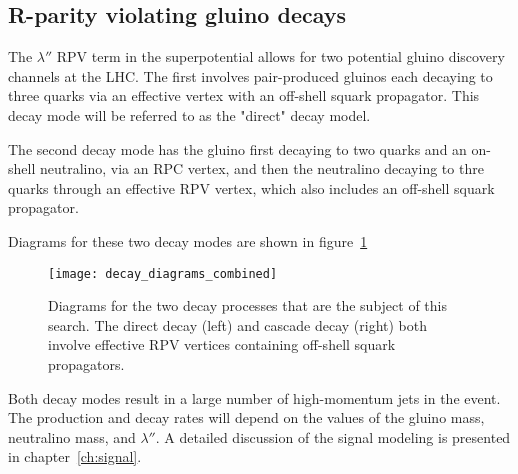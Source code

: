 \subsection{R-parity violating gluino decays}\label{subsec:rpv_gluino}

The $\lambda''$ RPV term in the superpotential allows for two potential gluino discovery channels at the LHC.
The first involves pair-produced gluinos each decaying to three quarks via an effective vertex with an off-shell squark propagator.
This decay mode will be referred to as the "direct" decay model.

The second decay mode has the gluino first decaying to two quarks and an on-shell neutralino, via an RPC vertex,
and then the neutralino decaying to thre quarks through an effective RPV vertex,
which also includes an off-shell squark propagator.

Diagrams for these two decay modes are shown in figure~\ref{fig:susy_rpv_decays}

\begin{figure}[h!]
    \centering
\texttt{[image: decay\_diagrams\_combined]}
\caption{Diagrams for the two decay processes that are the subject of this search. The direct decay (left) and cascade decay (right)
both involve effective RPV vertices containing off-shell squark propagators.}
\label{fig:susy_rpv_decays}
\end{figure}

Both decay modes result in a large number of high-momentum jets in the event.
The production and decay rates will depend on the values of the gluino mass, neutralino mass, and $\lambda''$.
A detailed discussion of the signal modeling is presented in chapter~\ref{ch:signal}.